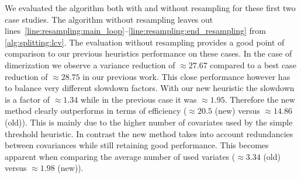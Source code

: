 We evaluated the algorithm both with and without resampling for these
first two case studies.
The algorithm without resampling  leaves out
lines~\ref{line:resampling:main_loop}--\ref{line:resampling:end_resampling}
from \autoref{alg:splitting:lcv}.
The evaluation without resampling provides a good point of comparison
to our previous heuristics performance on these cases.
In the case of dimerization we observe a variance reduction of
$\approx 27.67$ compared to a best case reduction of $\approx 28.75$
in our previous work.
This close performance however has to balance very different slowdown
factors. With our new heuristic the slowdown is a factor of $\approx
1.34$ while in the previous case it was $\approx 1.95$.
Therefore the new method clearly outperforms in terms of efficiency
($\approx 20.5$ (new) versus $\approx 14.86$ (old)).
This is mainly due to the higher number of covariates used by the
simple threshold heuristic.
In contrast the new method takes into account redundancies between
covariances while still retaining good performance.
This becomes apparent when comparing the average number of used
variates ($\approx 3.34$ (old) versus $\approx 1.98$ (new)).

